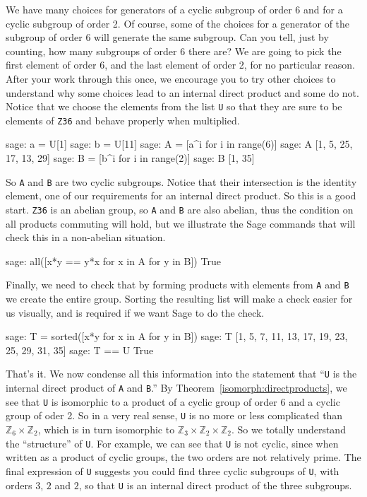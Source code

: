 %
We have many choices for generators of a cyclic subgroup of order 6 and for a cyclic subgroup of order 2.  Of course, some of the choices for a generator of the subgroup of order 6 will generate the same subgroup.  Can you tell, just by counting, how many subgroups of order 6 there are?  We are going to pick the first element of order 6, and the last element of order 2, for no particular reason.  After your work through this once, we encourage you to try other choices to understand why some choices lead to an internal direct product and some do not.  Notice that we choose the elements from the list \verb?U? so that they are sure to be elements of \verb?Z36? and behave properly when multiplied.
%
\begin{sageexample}
sage: a = U[1]
sage: b = U[11]
sage: A = [a^i for i in range(6)]
sage: A
[1, 5, 25, 17, 13, 29]
sage: B = [b^i for i in range(2)]
sage: B
[1, 35]
\end{sageexample}
%
So \verb?A? and \verb?B? are two cyclic subgroups.  Notice that their intersection is the identity element, one of our requirements for an internal direct product.  So this is a good start.  \verb?Z36? is an abelian group, so \verb?A? and \verb?B? are also abelian, thus the condition on all products commuting will hold, but we illustrate the Sage commands that will check this in a non-abelian situation.
%
\begin{sageexample}
sage: all([x*y == y*x for x in A for y in B])
True
\end{sageexample}
%
Finally, we need to check that by forming products with elements from \verb?A? and \verb?B? we create the entire group.  Sorting the resulting list will make a check easier for us visually, and is required if we want Sage to do the check.
%
\begin{sageexample}
sage: T = sorted([x*y for x in A for y in B])
sage: T
[1, 5, 7, 11, 13, 17, 19, 23, 25, 29, 31, 35]
sage: T == U
True
\end{sageexample}
%
That's it.  We now condense all this information into the statement that ``\verb?U? is the internal direct product of \verb?A? and \verb?B?.''  By Theorem~\ref{isomorph:directproducts}, we see that \verb?U? is isomorphic to a product of a cyclic group of order 6 and a cyclic group of oder 2.  So in a very real sense, \verb?U? is no more or less complicated than ${\mathbb Z}_6\times{\mathbb Z}_2$, which is in turn isomorphic to  ${\mathbb Z}_3\times{\mathbb Z}_2\times{\mathbb Z}_2$.  So we totally understand the ``structure'' of \verb?U?.  For example, we can see that \verb?U? is not cyclic, since when written as a product of cyclic groups, the two orders are not relatively prime.  The final expression of \verb?U? suggests you could find three cyclic subgroups of \verb?U?, with orders $3$, $2$ and $2$, so that \verb?U? is an internal direct product of the three subgroups.
%








